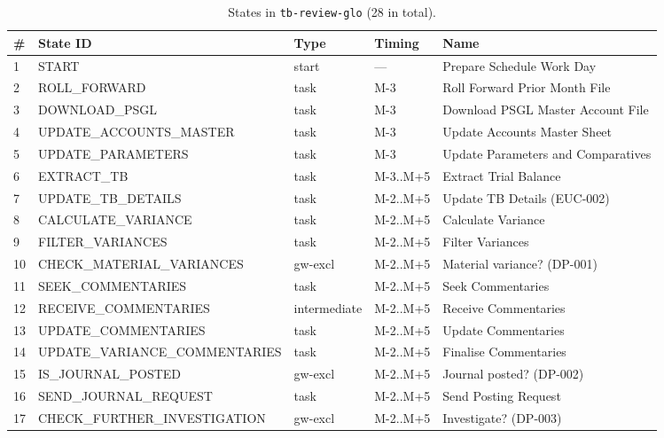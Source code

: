 \documentclass[11pt,a4paper,twoside]{report}
\begin{document}
\begin{table}[htbp]
\caption{States in \texttt{tb-review-glo} (28 in total).}\label{tab:states}
\centering
\footnotesize
\begin{tabularx}{\linewidth}{@{}llllX@{}}
\toprule
\textbf{\#} & \textbf{State ID} & \textbf{Type} & \textbf{Timing} & \textbf{Name} \\ \midrule
1  & START                         & start        & ---        & Prepare Schedule Work Day \\
2  & ROLL\_FORWARD                 & task         & M-3        & Roll Forward Prior Month File \\
3  & DOWNLOAD\_PSGL                & task         & M-3        & Download PSGL Master Account File \\
4  & UPDATE\_ACCOUNTS\_MASTER      & task         & M-3        & Update Accounts Master Sheet \\
5  & UPDATE\_PARAMETERS            & task         & M-3        & Update Parameters and Comparatives \\
6  & EXTRACT\_TB                   & task         & M-3..M+5   & Extract Trial Balance \\
7  & UPDATE\_TB\_DETAILS           & task         & M-2..M+5   & Update TB Details (EUC-002) \\
8  & CALCULATE\_VARIANCE           & task         & M-2..M+5   & Calculate Variance \\
9  & FILTER\_VARIANCES             & task         & M-2..M+5   & Filter Variances \\
10 & CHECK\_MATERIAL\_VARIANCES    & gw-excl      & M-2..M+5   & Material variance? (DP-001) \\
11 & SEEK\_COMMENTARIES            & task         & M-2..M+5   & Seek Commentaries \\
12 & RECEIVE\_COMMENTARIES         & intermediate & M-2..M+5   & Receive Commentaries \\
13 & UPDATE\_COMMENTARIES          & task         & M-2..M+5   & Update Commentaries \\
14 & UPDATE\_VARIANCE\_COMMENTARIES & task        & M-2..M+5   & Finalise Commentaries \\
15 & IS\_JOURNAL\_POSTED           & gw-excl      & M-2..M+5   & Journal posted? (DP-002) \\
16 & SEND\_JOURNAL\_REQUEST        & task         & M-2..M+5   & Send Posting Request \\
17 & CHECK\_FURTHER\_INVESTIGATION & gw-excl      & M-2..M+5   & Investigate? (DP-003) \\

\end{tabularx}
\end{table}
\end{document}
